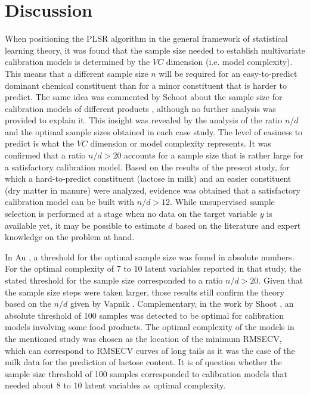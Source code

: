 \documentclass[journal=ancham,manuscript=article]{achemso}
\begin{document}



\section{Discussion}\label{discussion}

When positioning the PLSR algorithm in the general framework of statistical learning theory, it was found that the sample size needed to establish multivariate calibration models is determined by the $VC$ dimension (i.e. model complexity). This means that a different sample size $n$ will be required for an easy-to-predict dominant chemical constituent than for a minor constituent that is harder to predict. The same idea was commented by Schoot about the sample size for calibration models of different products \cite{Schoot2020}, although no further analysis was provided to explain it. This insight was revealed by the analysis of the ratio $n/d$ and the optimal sample sizes obtained in each case study. The level of easiness to predict is what the $VC$ dimension or model complexity represents. It was confirmed that a ratio $n/d>20$ accounts for a sample size that is rather large for a satisfactory calibration model. Based on the results of the present study, for which a hard-to-predict constituent (lactose in milk) and an easier constituent (dry matter in manure) were analyzed, evidence was obtained that a satisfactory calibration model can be built with $n/d>12$. While unsupervised sample selection is performed at a stage when no data on the target variable $y$ is available yet, it may be possible to estimate $d$ based on the literature and expert knowledge on the problem at hand.

In Au \cite{Au2020}, a threshold for the optimal sample size was found in absolute numbers. For the optimal complexity of 7 to 10 latent variables reported in that study, the stated threshold for the sample size corresponded to a ratio $n/d > 20$. Given that the sample size steps were taken larger, those results still confirm the theory based on the $n/d$ given by Vapnik \cite{Vapnik2000}. Complementary, in the work by Shoot  \cite{Schoot2020}, an absolute threshold of 100 samples was detected to be optimal for calibration models involving some food products. The optimal complexity of the models in the mentioned study was chosen as the location of the minimum RMSECV, which can correspond to RMSECV curves of long tails as it was the case of the milk data for the prediction of lactose content. It is of question whether the sample size threshold of 100 samples corresponded to calibration models that needed about 8 to 10 latent variables as optimal complexity.  
\end{document}
